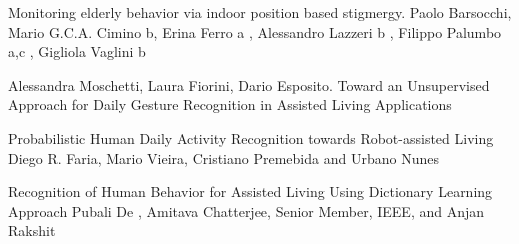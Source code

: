 \documentclass[a4paper, parskip=full]{scrartcl}
\begin{document}
\begin{thebibliography}{9}
Monitoring elderly behavior via indoor position based stigmergy.
Paolo Barsocchi, Mario G.C.A. Cimino b, Erina Ferro a , Alessandro Lazzeri b ,
Filippo Palumbo a,c , Gigliola Vaglini b
 

Alessandra	Moschetti, Laura Fiorini, Dario Esposito.
Toward an Unsupervised Approach for Daily Gesture Recognition in Assisted Living Applications

Probabilistic Human Daily Activity Recognition towards Robot-assisted Living
Diego R. Faria, Mario Vieira, Cristiano Premebida and Urbano Nunes

Recognition of Human Behavior for Assisted Living Using Dictionary Learning Approach
Pubali De , Amitava Chatterjee, Senior Member, IEEE, and Anjan Rakshit
	
	
\end{thebibliography}
 
\end{document}
